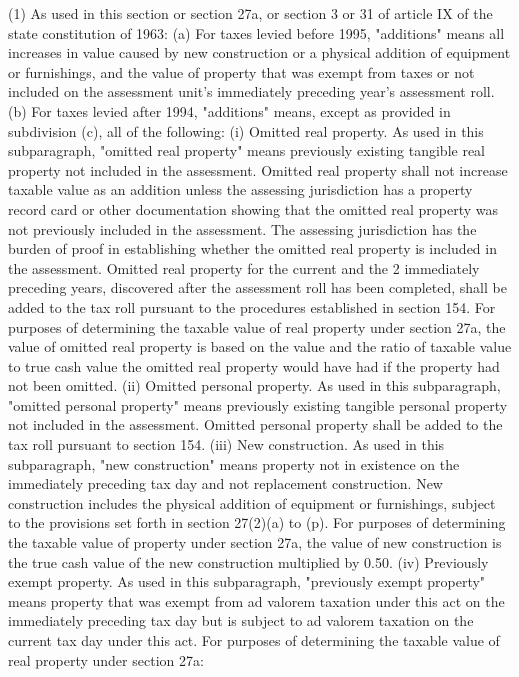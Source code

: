 \documentclass[12pt,\documentclassflag]{michiganCourtOfAppealsBrief}
\begin{document}
  (1) As used in this section or section 27a, or section 3 or 31 of article IX of the state constitution of 1963:
  (a) For taxes levied before 1995, "additions" means all increases in value caused by new construction or a physical addition of equipment or furnishings, and the value of property that was exempt from taxes or not included on the assessment unit's immediately preceding year's assessment roll.
  (b) For taxes levied after 1994, "additions" means, except as provided in subdivision (c), all of the following:
  (i) Omitted real property. As used in this subparagraph, "omitted real property" means previously existing tangible real property not included in the assessment. Omitted real property shall not increase taxable value as an addition unless the assessing jurisdiction has a property record card or other documentation showing that the omitted real property was not previously included in the assessment. The assessing jurisdiction has the burden of proof in establishing whether the omitted real property is included in the assessment. Omitted real property for the current and the 2 immediately preceding years, discovered after the assessment roll has been completed, shall be added to the tax roll pursuant to the procedures established in section 154. For purposes of determining the taxable value of real property under section 27a, the value of omitted real property is based on the value and the ratio of taxable value to true cash value the omitted real property would have had if the property had not been omitted.
  (ii) Omitted personal property. As used in this subparagraph, "omitted personal property" means previously existing tangible personal property not included in the assessment. Omitted personal property shall be added to the tax roll pursuant to section 154.
  (iii) New construction. As used in this subparagraph, "new construction" means property not in existence on the immediately preceding tax day and not replacement construction. New construction includes the physical addition of equipment or furnishings, subject to the provisions set forth in section 27(2)(a) to (p). For purposes of determining the taxable value of property under section 27a, the value of new construction is the true cash value of the new construction multiplied by 0.50.
  (iv) Previously exempt property. As used in this subparagraph, "previously exempt property" means property that was exempt from ad valorem taxation under this act on the immediately preceding tax day but is subject to ad valorem taxation on the current tax day under this act. For purposes of determining the taxable value of real property under section 27a:
\end{document}
